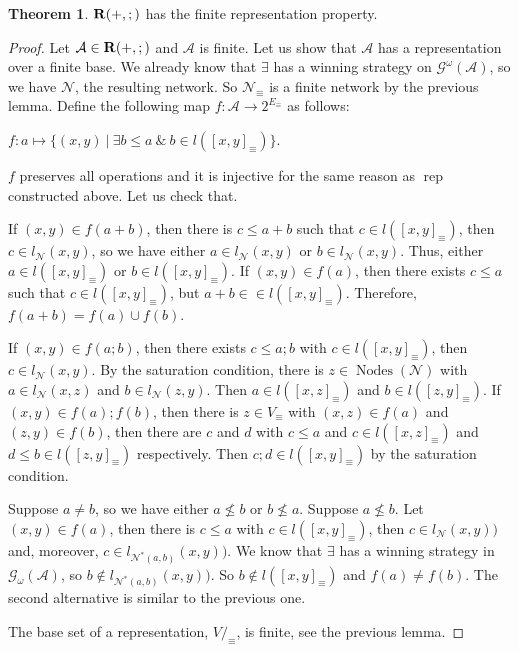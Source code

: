 \documentclass[a4paper]{article}
\theoremstyle{definition}
\theoremstyle{theorem}
\newtheorem{theorem}{Theorem}
\theoremstyle{proposition}
\theoremstyle{lemma}
\theoremstyle{ex}
\theoremstyle{corollary}
\theoremstyle{claim}
\begin{document}
\begin{theorem}\label{frpjoin}
  ${\bf R}(+, ;)$ has the finite representation property.
\end{theorem}

\begin{proof}
  Let $\mathcal{A} \in {\bf R}(+, ;)$ and $\mathcal{A}$ is finite.
  Let us show that $\mathcal{A}$ has a representation over a finite base.
  We already know that $\exists$ has a winning strategy on $\mathcal{G}^{\omega}(\mathcal{A})$, so we have $\mathcal{N}$, the resulting network. So $\mathcal{N}_{\equiv}$ is a finite network by the previous lemma.
  Define the following map $f : \mathcal{A} \to 2^{E_{\equiv}}$ as follows:
\begin{center}
  $f : a \mapsto \{ (x,y) \: | \: \exists b \leq a \: \& \: b \in l([x,y]_{\equiv}) \}$.
\end{center}
$f$ preserves all operations and it is injective for the same reason as $\operatorname{rep}$ constructed above. Let us check that.

If $(x,y) \in f(a + b)$, then there is $c \leq a + b$ such that $c \in l([x,y]_{\equiv})$, then $c \in l_{\mathcal{N}}(x,y)$, so we have either $a \in l_{\mathcal{N}}(x,y)$ or $b \in l_{\mathcal{N}}(x,y)$. Thus, either $a \in l([x,y]_{\equiv})$ or $b \in l([x,y]_{\equiv})$.
If $(x, y) \in f(a)$, then there exists $c \leq a$ such that $c \in l([x,y]_{\equiv})$, but $a + b \in \in l([x,y]_{\equiv})$. Therefore, $f(a + b) = f(a) \cup f(b)$.

If $(x,y) \in f(a ; b)$, then there exists $c \leq a ; b$ with $c \in l([x,y]_{\equiv})$, then $c \in l_{\mathcal{N}}(x,y)$. By the saturation condition, there is $z \in \operatorname{Nodes}(\mathcal{N})$ with $a \in l_{\mathcal{N}}(x,z)$ and $b \in l_{\mathcal{N}}(z,y)$.
Then $a \in l([x,z]_{\equiv})$ and $b \in l([z,y]_{\equiv})$.
If $(x,y) \in f(a);f(b)$, then there is $z \in V_{\equiv}$ with $(x, z) \in f(a)$ and $(z, y) \in f(b)$, then there are $c$ and $d$ with $c \leq a$ and $c \in l([x,z]_{\equiv})$ and $d \leq b \in l([z,y]_{\equiv})$ respectively. Then $c ; d \in l([x,y]_{\equiv})$ by the saturation condition.

Suppose $a \neq b$, so we have either $a \not\leq b$ or $b \not\leq a$.
Suppose $a \not\leq b$. Let $(x, y) \in f(a)$, then there is $c \leq a$ with $c \in l([x,y]_{\equiv})$, then $c \in l_{\mathcal{N}}(x,y))$ and, moreover, $c \in l_{\mathcal{N}^{*}(a,b)}(x,y))$.
We know that $\exists$ has a winning strategy in $\mathcal{G}_{\omega}(\mathcal{A})$, so
$b \notin l_{\mathcal{N}^{*}(a,b)}(x,y))$. So $b \notin l([x,y]_{\equiv})$ and $f(a) \neq f(b)$.
The second alternative is similar to the previous one.

The base set of a representation, $V /_{\equiv}$, is finite, see the previous lemma.
\end{proof}
\end{document}
